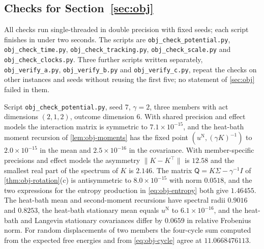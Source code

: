 \subsection{Checks for \texorpdfstring{Section~\ref{sec:obj}}{conflicting objectives, deliberation time and scale selection}}\label{chk:obj}

\begin{sloppypar}
All checks run single-threaded in double precision with fixed seeds; each script finishes in under two seconds. The scripts are \texttt{obj\_\allowbreak check\_\allowbreak potential.py}, \texttt{obj\_\allowbreak check\_\allowbreak time.py}, \texttt{obj\_\allowbreak check\_\allowbreak tracking.py}, \texttt{obj\_\allowbreak check\_\allowbreak scale.py} and \texttt{obj\_\allowbreak check\_\allowbreak clocks.py}. Three further scripts written separately, \texttt{obj\_\allowbreak verify\_\allowbreak a.py}, \texttt{obj\_\allowbreak verify\_\allowbreak b.py} and \texttt{obj\_\allowbreak verify\_\allowbreak c.py}, repeat the checks on other instances and seeds without reusing the first five; no statement of \cref{sec:obj} failed in them.
\end{sloppypar}

\begin{numcheck}\label{chk:obj-potential}
Script \texttt{obj\_\allowbreak check\_\allowbreak potential.py}, seed $7$, $\gamma=2$, three members with act dimensions $(2,1,2)$, outcome dimension $6$. With shared precision and effect models the interaction matrix is symmetric to $7.1\times10^{-15}$, and the heat-bath moment recursion of \cref{lem:obj-moments} has the fixed point $(u^{\mathrm N},(\gamma K)^{-1})$ to $2.0\times10^{-15}$ in the mean and $2.5\times10^{-16}$ in the covariance. With member-specific precisions and effect models the asymmetry $\lVert K-K^\top\rVert$ is $12.58$ and the smallest real part of the spectrum of $K$ is $2.146$. The matrix $\mathsf Q=K\Sigma-\gamma^{-1}I$ of \cref{thm:obj-rotation}(c) is antisymmetric to $8.0\times10^{-15}$ with norm $0.0518$, and the two expressions for the entropy production in \eqref{eq:obj-entropy} both give $1.46455$. The heat-bath mean and second-moment recursions have spectral radii $0.9016$ and $0.8253$, the heat-bath stationary mean equals $u^{\mathrm N}$ to $6.1\times10^{-16}$, and the heat-bath and Langevin stationary covariances differ by $0.0659$ in relative Frobenius norm. For random displacements of two members the four-cycle sum computed from the expected free energies and from \eqref{eq:obj-cycle} agree at $11.0668476113$.
\end{numcheck}

